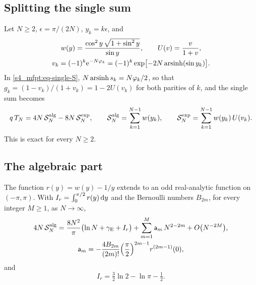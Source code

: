 \subsection{Splitting the single sum}

Let $N\ge2$, $\epsilon=\pi/(2N)$, $y_k=k\epsilon$, and
\begin{equation}\label{appB_expansion:eq-defs}
\begin{gathered}
  w(y)=\frac{\cos^{2}y\,\sqrt{1+\sin^{2}y}}{\sin y},\qquad U(v)=\frac{v}{1+v},\\
  v_k=(-1)^{k}\mathrm{e}^{-N\varphi_{k}}=(-1)^{k}\exp\bigl[-2N\operatorname{arsinh}(\sin y_k)\bigr].
\end{gathered}
\end{equation}
In \eqref{s4_mfpt:eq-single-S}, $N\operatorname{arsinh}s_{k}=N\varphi_{k}/2$, so that $g_k=(1-v_k)/(1+v_k)=1-2U(v_k)$ for both
parities of $k$, and the single sum becomes
\begin{equation}\label{appB_expansion:eq-split}
  q\,T_{N}=4N\,\mathcal S^{\mathrm{alg}}_N-8N\,\mathcal S^{\mathrm{exp}}_N,\qquad
  \mathcal S^{\mathrm{alg}}_N=\sum_{k=1}^{N-1}w(y_k),\qquad
  \mathcal S^{\mathrm{exp}}_N=\sum_{k=1}^{N-1}w(y_k)\,U(v_k).
\end{equation}
This is exact for every $N\ge2$. %

\subsection{The algebraic part}

\begin{lemma}\label{appB_expansion:lem-alg}
The function $r(y)=w(y)-1/y$ extends to an odd real-analytic function on $(-\pi,\pi)$. With
$I_r=\int_{0}^{\pi/2}r(y)\,\mathrm{d} y$ and the Bernoulli numbers $B_{2m}$, for every integer $M\ge1$, as $N\to\infty$,
\begin{equation}\label{appB_expansion:eq-alg}
\begin{gathered}
  4N\,\mathcal S^{\mathrm{alg}}_N=\frac{8N^{2}}{\pi}\bigl(\ln N+\gamma_{\mathrm{E}}+I_r\bigr)+\sum_{m=1}^{M}\mathsf{a}_m\,N^{2-2m}
  +O\bigl(N^{-2M}\bigr),\\
  \mathsf{a}_m=-\frac{4B_{2m}}{(2m)!}\Bigl(\frac\pi2\Bigr)^{2m-1}r^{(2m-1)}(0),
\end{gathered}
\end{equation}
and
\begin{equation}\label{appB_expansion:eq-Ir}
  I_r=\tfrac32\ln2-\ln\pi-\tfrac12 .
\end{equation}
\end{lemma}

